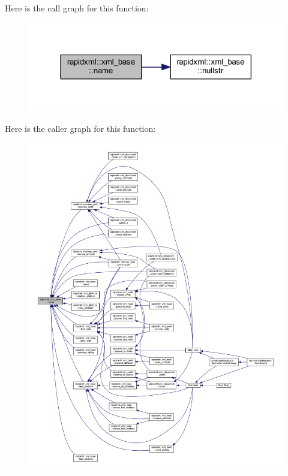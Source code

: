 Here is the call graph for this function\+:\nopagebreak
\begin{figure}[H]
\begin{center}
\leavevmode
\includegraphics[width=318pt]{classrapidxml_1_1xml__base_a9a09739310469995db078ebd0da3ed45_cgraph}
\end{center}
\end{figure}




Here is the caller graph for this function\+:
\nopagebreak
\begin{figure}[H]
\begin{center}
\leavevmode
\includegraphics[width=350pt]{classrapidxml_1_1xml__base_a9a09739310469995db078ebd0da3ed45_icgraph}
\end{center}
\end{figure}


